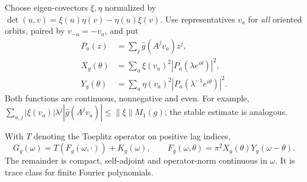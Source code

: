 Choose eigen-covectors $\xi,\eta$ normalized by
$\det(u,v)=\xi(u)\eta(v)-\eta(u)\xi(v)$.
Use representatives $v_a$ for \emph{all} oriented orbits, paired by
$v_{-a}=-v_a$, and put
\begin{align*}
 P_a(z)&=\sum_j\widehat g(A^jv_a)z^j,\\
 X_g(\theta)&=\sum_a\xi(v_a)^2|P_a(\lambda e^{i\theta})|^2,\\
 Y_g(\theta)&=\sum_a\eta(v_a)^2|P_a(\lambda^{-1}e^{i\theta})|^2.
\end{align*}
Both functions are continuous, nonnegative and even. For example,
$\sum_{a,j}|\xi(v_a)|\lambda^j|\widehat g(A^jv_a)|
\le\|\xi\|M_1(g)$; the stable estimate is analogous.

\begin{theorem}\label{thm:two-variable-tail}
With $T$ denoting the Toeplitz operator on positive lag indices,
\[
 G_g(\omega)=T(F_g(\omega,\cdot))+K_g(\omega),\qquad
 F_g(\omega,\theta)=\pi^2X_g(\theta)Y_g(\omega-\theta).
\]
The remainder is compact, self-adjoint and operator-norm continuous in
$\omega$. It is trace class for finite Fourier polynomials.
\end{theorem}
